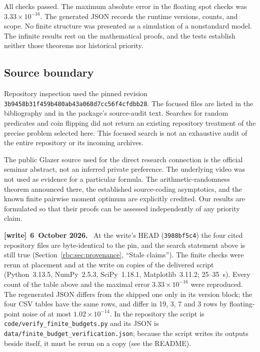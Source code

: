 \documentclass[11pt]{article}
\numberwithin{equation}{section}
\theoremstyle{definition}
\theoremstyle{remark}
\newcommand{\file}[1]{\nolinkurl{#1}}
\newenvironment{writenote}[1][]{\par\smallskip\begingroup\small
 \noindent\textbf{[write]}\if\relax\detokenize{#1}\relax\else~\textbf{#1.}\fi\ }%
 {\par\endgroup\smallskip}
\begin{document}
All checks passed. The maximum absolute error in the floating spot checks
was $3.33\times10^{-16}$. The generated JSON records the runtime versions,
counts, and scope. No finite structure was presented as a simulation of a
nonstandard model. The infinite results rest on the mathematical proofs,
and the tests establish neither those theorems nor historical priority.

\subsection{Source boundary}

Repository inspection used the pinned revision
\texttt{3b9458b31f459b480ab43a068d7cc56f4cfdbb28}. The focused files are
listed in the bibliography and in the package's source-audit text. Searches
for random predicates and coin flipping did not return an existing
repository treatment of the precise problem selected here. This focused
search is not an exhaustive audit of the entire repository or its incoming
archives.

The public Glazer source used for the direct research connection is the
official seminar abstract, not an inferred private preference. The
underlying video was not used as evidence for a particular formula.
The arithmetic-randomness theorem announced there, the established
source-coding asymptotics, and the known finite pairwise moment optimum
are explicitly credited. Our results are formulated so that their proofs
can be assessed independently of any priority claim.

\begin{writenote}[6~October 2026]
At the write's HEAD (\file{3988bf5c4}) the four cited repository files are
byte-identical to the pin, and the search statement above is still true
(Section~\ref{rbc:sec:provenance}, ``Stale claims''). The finite checks were
rerun at placement and at the write on copies of the delivered script
(Python~3.13.5, NumPy~2.5.3, SciPy~1.18.1, Matplotlib~3.11.2; 25--35~s).
Every count of the table above and the maximal error
$3.33\times10^{-16}$ were reproduced. The regenerated JSON differs from the
shipped one only in its version block; the four CSV tables have the same
rows, and differ in 19, 3, 7 and 3 rows by floating-point noise of at most
$1.02\times10^{-14}$. In the repository the script is
\file{code/verify_finite_budgets.py} and its JSON is
\file{data/finite_budget_verification.json}; because the script writes its
outputs beside itself, it must be rerun on a copy (see the README).
\end{writenote}
\end{document}
